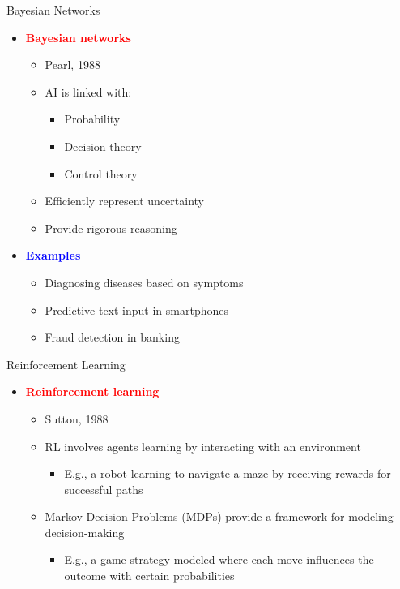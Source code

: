 \documentclass[
  10pt,
  ignorenonframetext,
]{beamer}
\providecommand{\tightlist}{%
  \setlength{\itemsep}{0pt}\setlength{\parskip}{0pt}}
\begin{document}
\begin{frame}{Bayesian Networks}
\label{bayesian-networks}
\begin{itemize}
\tightlist
\item
  \textbf{\textcolor{red}{Bayesian networks}}

  \begin{itemize}
  \tightlist
  \item
    Pearl, 1988
  \item
    AI is linked with:

    \begin{itemize}
    \tightlist
    \item
      Probability
    \item
      Decision theory
    \item
      Control theory
    \end{itemize}
  \item
    Efficiently represent uncertainty
  \item
    Provide rigorous reasoning
  \end{itemize}
\item
  \textbf{\textcolor{blue}{Examples}}

  \begin{itemize}
  \tightlist
  \item
    Diagnosing diseases based on symptoms
  \item
    Predictive text input in smartphones
  \item
    Fraud detection in banking
  \end{itemize}
\end{itemize}
\end{frame}

\begin{frame}{Reinforcement Learning}
\label{reinforcement-learning}
\begin{itemize}
\tightlist
\item
  \textbf{\textcolor{red}{Reinforcement learning}}

  \begin{itemize}
  \tightlist
  \item
    Sutton, 1988
  \item
    RL involves agents learning by interacting with an environment

    \begin{itemize}
    \tightlist
    \item
      E.g., a robot learning to navigate a maze by receiving rewards for
      successful paths
    \end{itemize}
  \item
    Markov Decision Problems (MDPs) provide a framework for modeling
    decision-making

    \begin{itemize}
    \tightlist
    \item
      E.g., a game strategy modeled where each move influences the
      outcome with certain probabilities
    \end{itemize}
  \end{itemize}
\end{itemize}
\end{frame}
\end{document}
